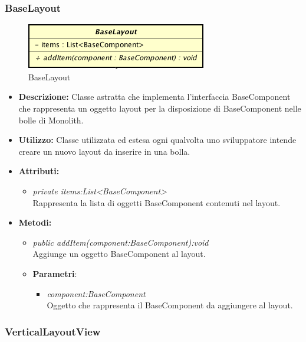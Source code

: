 \subsubsection{BaseLayout}

\label{BaseLayout}
\begin{figure}[ht]
	\centering
	\includegraphics[scale=0.5]{Sezioni/SottosezioniST/img/BaseLayout.png}
	\caption{BaseLayout}
\end{figure}

\begin{itemize}
\item \textbf{Descrizione:} Classe astratta che implementa l'interfaccia BaseComponent che rappresenta un oggetto layout per la disposizione di BaseComponent nelle bolle di Monolith.
\item \textbf{Utilizzo:} Classe utilizzata ed estesa ogni qualvolta uno sviluppatore intende creare un nuovo layout da inserire in una bolla.
\item \textbf{Attributi:}
\begin{itemize}
\item \textit{private items:List<BaseComponent>}\\
Rappresenta la lista di oggetti BaseComponent contenuti nel layout.
\end{itemize}
\item \textbf{Metodi:}
\begin{itemize}
\item \textit{public addItem(component:BaseComponent):void}\\
Aggiunge un oggetto BaseComponent al layout.
\item{\textbf{Parametri}: \begin{itemize}
\item \textit{component:BaseComponent}\\
Oggetto che rappresenta il BaseComponent da aggiungere al layout.
\end{itemize}}
\end{itemize}
\end{itemize}

\subsubsection{VerticalLayoutView}

